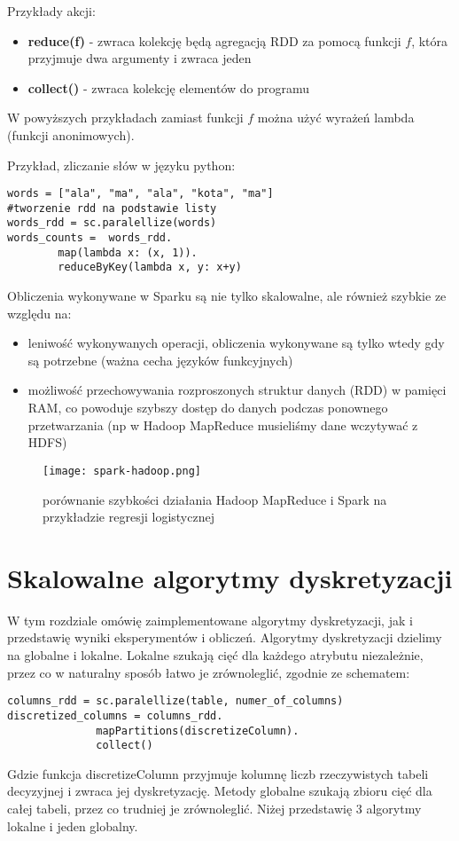 \documentclass[magisterska]{pracamgr}
\theoremstyle{plain}
\theoremstyle{definition}
\theoremstyle{remark}
\begin{document}
Przykłady akcji:
\begin{itemize}
 \item \textbf{reduce(f)} - zwraca kolekcję będą agregacją RDD za pomocą funkcji $f$, która przyjmuje dwa 
 argumenty i zwraca jeden
 \item \textbf{collect()} - zwraca kolekcję elementów do programu
\end{itemize}

W powyższych przykładach zamiast funkcji $f$ można użyć wyrażeń lambda (funkcji anonimowych).

Przykład, zliczanie słów w języku python:
\begin{lstlisting}[frame=single] 
words = ["ala", "ma", "ala", "kota", "ma"]
#tworzenie rdd na podstawie listy
words_rdd = sc.paralellize(words)          
words_counts =  words_rdd.
		map(lambda x: (x, 1)).
		reduceByKey(lambda x, y: x+y)
\end{lstlisting}

Obliczenia wykonywane w Sparku są nie tylko skalowalne, ale również szybkie ze względu na:
\begin{itemize}
 \item leniwość wykonywanych operacji, obliczenia wykonywane są tylko wtedy gdy są potrzebne (ważna cecha
 języków funkcyjnych)
 \item możliwość przechowywania rozproszonych struktur danych (RDD) w pamięci RAM, co powoduje szybszy dostęp do danych
 podczas ponownego przetwarzania (np w Hadoop MapReduce musieliśmy dane wczytywać z HDFS)
\end{itemize}

\newpage

\begin{figure}
 \caption{porównanie szybkości działania Hadoop MapReduce i Spark na przykładzie regresji logistycznej}
 \texttt{[image: spark-hadoop.png]}
\end{figure}


\chapter{Skalowalne algorytmy dyskretyzacji}

W tym rozdziale omówię zaimplementowane algorytmy dyskretyzacji, jak i przedstawię wyniki eksperymentów i obliczeń.
Algorytmy dyskretyzacji dzielimy na globalne i lokalne. Lokalne szukają cięć dla każdego atrybutu niezależnie, przez 
co w naturalny sposób łatwo je zrównoleglić, zgodnie ze schematem:
\begin{lstlisting}[frame=single] 
columns_rdd = sc.paralellize(table, numer_of_columns)          
discretized_columns = columns_rdd.
		      mapPartitions(discretizeColumn).
		      collect()
\end{lstlisting}
Gdzie funkcja discretizeColumn przyjmuje kolumnę liczb rzeczywistych tabeli decyzyjnej i zwraca
jej dyskretyzację.
Metody globalne szukają zbioru cięć dla całej tabeli, przez co trudniej je zrównoleglić.
Niżej przedstawię 3 algorytmy lokalne i jeden globalny.
\end{document}
